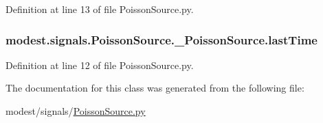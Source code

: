 Definition at line 13 of file Poisson\+Source.\+py.

\subsubsection[{\texorpdfstring{last\+Time}{lastTime}}]{\setlength{\rightskip}{0pt plus 5cm}modest.\+signals.\+Poisson\+Source.\+\_\+\+Poisson\+Source.\+last\+Time}\hypertarget{classmodest_1_1signals_1_1PoissonSource_1_1__PoissonSource_a96ba5dd0643792be6fbf7af966515a01}{}\label{classmodest_1_1signals_1_1PoissonSource_1_1__PoissonSource_a96ba5dd0643792be6fbf7af966515a01}


Definition at line 12 of file Poisson\+Source.\+py.



The documentation for this class was generated from the following file\+:\begin{DoxyCompactItemize}
\item 
modest/signals/\hyperlink{PoissonSource_8py}{Poisson\+Source.\+py}\end{DoxyCompactItemize}
